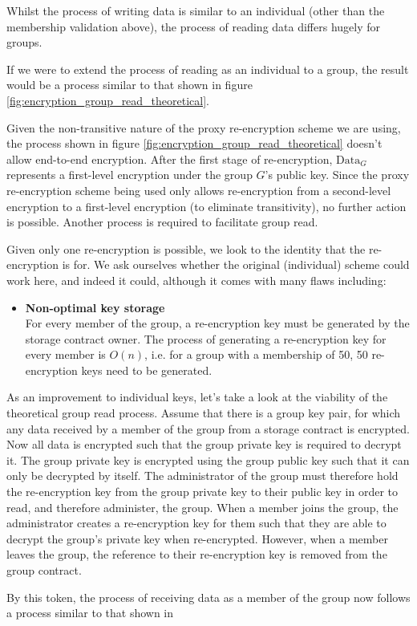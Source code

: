 Whilst the process of writing data is similar to an individual (other than the membership validation above), the process of reading data differs hugely for groups.

If we were to extend the process of reading as an individual to a group, the result would be a process similar to that shown in figure \ref{fig:encryption_group_read_theoretical}.



Given the non-transitive nature of the proxy re-encryption scheme we are using, the process shown in figure \ref{fig:encryption_group_read_theoretical} doesn't allow end-to-end encryption. After the first stage of re-encryption, $\text{Data}_{G}$ represents a first-level encryption under the group $G$'s public key. Since the proxy re-encryption scheme being used only allows re-encryption from a second-level encryption to a first-level encryption (to eliminate transitivity), no further action is possible. Another process is required to facilitate group read.

Given only one re-encryption is possible, we look to the identity that the re-encryption is for. We ask ourselves whether the original (individual) scheme could work here, and indeed it could, although it comes with many flaws including:

\begin{itemize}
  \item 
  	\textbf{Non-optimal key storage} \\
    For every member of the group, a re-encryption key must be generated by the storage contract owner. The process of generating a re-encryption key for every member is $O(n)$, i.e. for a group with a membership of 50, 50 re-encryption keys need to be generated.
\end{itemize}

As an improvement to individual keys, let's take a look at the viability of the theoretical group read process. Assume that there is a group key pair, for which any data received by a member of the group from a storage contract is encrypted. Now all data is encrypted such that the group private key is required to decrypt it. The group private key is encrypted using the group public key such that it can only be decrypted by itself. The administrator of the group must therefore hold the re-encryption key from the group private key to their public key in order to read, and therefore administer, the group. When a member joins the group, the administrator creates a re-encryption key for them such that they are able to decrypt the group's private key when re-encrypted. However, when a member leaves the group, the reference to their re-encryption key is removed from the group contract.

By this token, the process of receiving data as a member of the group now follows a process similar to that shown in 
